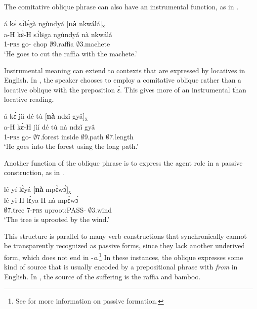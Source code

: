 \noindent The comitative oblique phrase can also have an instrumental function, as in .

\ea \label{naINS1a}
  \glll  á kɛ́ sɔ́lɛ̀gà ngùndyá [{\bfseries nà} nkwálá]\textsubscript{\textsc{x}}  \\
          a-H kɛ̀-H sɔ́lɛga ngùndyá {\db}nà nkwálá   \\
      1-\textsc{prs} go-{\R} chop $\emptyset$9.raffia {\db}{\COM} $\emptyset$3.machete\\
    \trans `He goes to cut the raffia with the machete.'
\z

Instrumental meaning can extend to contexts that are expressed by locatives in English. In , the speaker chooses to employ a comitative oblique rather than a locative oblique with the preposition {\itshape ɛ́}. This gives more of an instrumental than locative reading.

\ea \label{naINS1}
  \glll  á kɛ́ jìí dé tù [{\bfseries nà} ndzǐ gyâ]\textsubscript{\textsc{x}}  \\
          a-H kɛ̀-H jìí dé tù {\db}nà ndzǐ gyâ      \\
      1-\textsc{prs} go-{\R} $\emptyset$7.forest {\LOC} inside {\db}{\COM} $\emptyset$9.path $\emptyset$7.length\\
    \trans `He goes into the forest using the long path.'
\z

\noindent Another function of the oblique phrase is to express the agent role in a passive construction, as in .

\ea \label{naPASS}
  \glll lé yí lɛ̀yá [{\bfseries nà} mpɛ̀wɔ́]\textsubscript{\textsc{x}}  \\
        lé yi-H lɛ̀ya-H {\db}nà mpɛ̀wɔ́ \\
        $\emptyset$7.tree 7-\textsc{prs} uproot:PASS-{\R} {\db}{\COM} $\emptyset$3.wind\\
    \trans `The tree is uprooted by the wind.'
\z

\noindent This structure is parallel to many verb constructions that synchronically cannot be transparently recognized as passive forms, since they lack another underived form, which does not end in -{\itshape a}.\footnote{See  for more information on passive formation.}
In these instances, the oblique expresses some kind of source that is usually encoded by a prepositional phrase with {\itshape from} in English. In , the source of the suffering is the raffia and bamboo.

